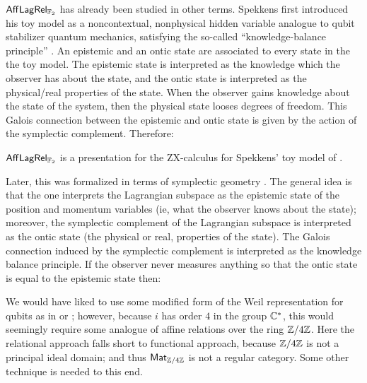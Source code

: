  $\mathsf{Aff}\mathsf{Lag}\mathsf{Rel}_{\mathbb{F}_2}$ has already been studied in other terms. Spekkens first introduced his toy model as a noncontextual, nonphysical hidden variable analogue to qubit stabilizer quantum mechanics, satisfying the so-called ``knowledge-balance principle'' \cite{spekkens}.  An epistemic and an ontic state are associated to every state in the the toy model.  The epistemic state is interpreted as the knowledge which the observer has about the state, and the ontic state is interpreted as the physical/real properties of the state.  When the observer gains knowledge about the state of the system, then the physical state looses degrees of freedom. This Galois connection between the epistemic and ontic state is given by the action of the symplectic complement. Therefore:

\begin{corollary}
$\mathsf{Aff}\mathsf{Lag}\mathsf{Rel}_{\mathbb{F}_2}$ is a presentation for the ZX-calculus for Spekkens' toy model of \cite{backensspek}.
\end{corollary}




Later, this was formalized in terms of symplectic geometry \cite{spekkens2016quasi}. %
 The general idea is that the one interprets the Lagrangian subspace as the epistemic state of the position and momentum variables (ie, what the observer knows about the state); moreover, the symplectic complement of the Lagrangian subspace is interpreted as the ontic state (the physical or real, properties of the state).  The Galois connection induced by the symplectic complement is interpreted as the knowledge balance principle.  If the observer never measures anything so that the ontic state is equal to the epistemic state then:

We would have liked to use some modified form of the Weil representation for qubits as in \cite[\S 3.3]{heinrich2021stabiliser} or \cite{niel}; however, because $i$ has order $4$ in the group $\mathbb{C}^*$, this would seemingly require some analogue of affine relations over the ring $\mathbb{Z}/4\mathbb{Z}$.   Here the relational approach falls short to functional approach, because ${\mathbb{Z}/4\mathbb{Z}}$  is not a principal ideal domain; and thus  $\mathsf{Mat}_{\mathbb{Z}/4\mathbb{Z}}$  is not a regular category.  Some other technique is needed to this end.

